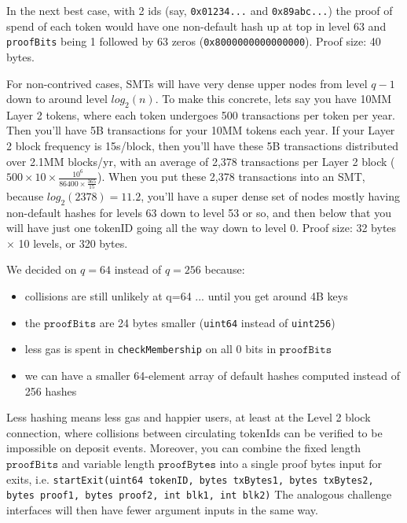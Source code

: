 \documentclass{article}
\newcommand{\proofBits}{\texttt{proofBits}}
\newcommand{\proofBytes}{\texttt{proofBytes}}
\begin{document}
In the next best case, with 2 ids (say, \texttt{0x01234...} and \texttt{0x89abc...}) the proof of spend of each token would have one non-default hash up at top in level 63 and \texttt{proofBits} being 1 followed by 63 zeros (\texttt{0x8000000000000000}). Proof size: 40 bytes.

For non-contrived cases, SMTs will have very dense upper nodes from level $q-1$ down to around level $log_2(n)$. To make this concrete, lets say you have 10MM Layer 2 tokens, where each token undergoes 500 transactions per token per year. Then you'll have 5B transactions for your 10MM tokens each year. If your Layer 2 block frequency is 15s/block, then you'll have these 5B transactions distributed over 2.1MM blocks/yr, with an average of 2,378 transactions per Layer 2 block ($500 \times 10 \times \frac{10^{6}}{86400 \times \frac{365}{15}}$). When you put these 2,378 transactions into an SMT, because $log_2(2378)=11.2$, you'll have a super dense set of nodes mostly having non-default hashes for levels 63 down to level 53 or so, and then below that you will have just one tokenID going all the way down to level 0. Proof size: 32 bytes $\times$ 10 levels, or 320 bytes.

We decided on $q=64$ instead of $q=256$ because:
\begin{itemize}
\item collisions are still unlikely at q=64 ... until you get around 4B keys
\item the $\proofBits$ are 24 bytes smaller (\texttt{uint64} instead of \texttt{uint256})
\item less gas is spent in \texttt{checkMembership} on all 0 bits in $\proofBits$
\item we can have a smaller 64-element array of default hashes computed instead of 256 hashes
\end{itemize}
Less hashing means less gas and happier users, at least at the Level 2 block connection, where collisions between circulating tokenIds can be verified to be impossible on deposit events.  Moreover, you can combine the fixed length $\proofBits$ and variable length $\proofBytes$ into a single proof bytes input for exits, i.e. \texttt{startExit(uint64 tokenID, bytes txBytes1, bytes txBytes2, bytes proof1, bytes proof2, int blk1, int blk2)}  The analogous challenge interfaces will then have fewer argument inputs in the same way.
\end{document}
